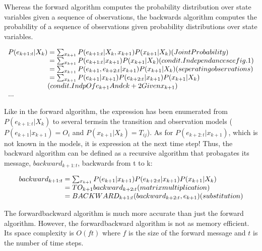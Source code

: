 \documentclass[a4paper]{article}
\begin{document}
Whereas the forward algorithm computes the probability distribution over state variables given a sequence of observations, the backwards algorithm computes the probability of a sequence of observations given probability distributions over state variables. 

\begin{equation}
\begin{array}{l@{}l}

P(e_{k+1:t}|X_k) 
&{}= \sum_{\substack{x_{k+1}}} P(e_{k+1:t}|X_k, x_{k+1})P(x_{k+1}|X_k)(Joint Probability)\\
&{}= \sum_{\substack{x_{k+1}}} P(e_{k+1:t}|x_{k+1})P(x_{k+1}|X_k)(condit. Independance see fig.1)\\
&{}= \sum_{\substack{x_{k+1}}} P(e_{k+1},e_{k+2:t}|x_{k+1})P(x_{k+1}|X_k)(seperating observations)\\
&{}= \sum_{\substack{x_{k+1}}} P(e_{k+1}|x_{k+1})P(e_{k+2:t}|x_{k+1})P(x_{k+1}|X_k)\\&{}(condit. Indp Of e_{k+1} And e{k+2} Given x_{k+1})\\
...

\end{array}
\end{equation}

Like in the forward algorithm, the expression has been enumerated from $P(e_{k+1:t}|X_k)$ to several termsin the transition and observation models ($P(e_{k+1}|x_{k+1}) = O_i$ and $P(x_{k+1}|X_k) = T_{ij}$). As for $P(e_{k+2:t}|x_{k+1})$, which is not known in the models, it is expression at the next time step! Thus, the backward algorithm can be defined as a recursive algorithm that probagates its message, $backward_{k+1:t}$, backwards from t to k:

\begin{equation}
\begin{array}{l@{}l}
backward_{k+1:t}
&{}= \sum_{\substack{x_{k+1}}} P(e_{k+1}|x_{k+1})P(e_{k+2:t}|x_{k+1})P(x_{k+1}|X_k)\\
&{}= TO_{k+1} backward_{k+2:t}(matrix multiplication)\\
&{}= BACKWARD_{k+1:t}(backward_{k+2:t}, e_{k+1})(substitution)\\
\end{array}
\end{equation}

The forwardbackward algorithm is much more accurate than just the forward algorithm. However, the forwardbackward algorithm is not as memory efficient. Its space complexity is $O(ft)$ where $f$ is the size of the forward message and $t$ is the number of time steps.
\end{document}
